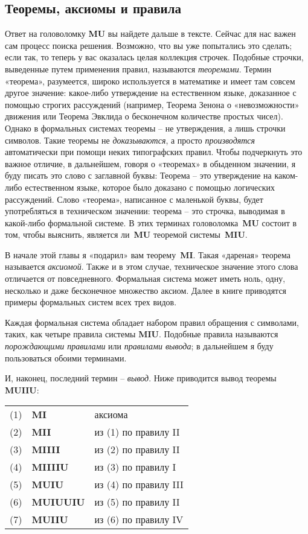 \documentclass[../main.tex]{subfiles}
\begin{document}
\subsection{Теоремы, аксиомы и правила}

Ответ на головоломку \textbf{MU} вы найдете дальше в тексте. Сейчас для нас важен сам процесс поиска решения. Возможно, что вы уже попытались это сделать; если так, то теперь у вас оказалась целая коллекция строчек. Подобные строчки, выведенные путем применения правил, называются \emph{теоремами}. Термин «теорема», разумеется, широко используется в математике и имеет там совсем другое значение: какое-либо утверждение на естественном языке, доказанное с помощью строгих рассуждений (например, Теорема Зенона о «невозможности» движения или Теорема Эвклида о бесконечном количестве простых чисел). Однако в формальных системах теоремы \--- не утверждения, а лишь строчки символов. Такие теоремы не \emph{доказываются}, а просто \emph{производятся} автоматически при помощи неких типографских правил. Чтобы подчеркнуть это важное отличие, в дальнейшем, говоря о «теоремах» в обыденном значении, я буду писать это слово с заглавной буквы: Теорема \--- это утверждение на каком-либо естественном языке, которое было доказано с помощью логических рассуждений. Слово «теорема», написанное с маленькой буквы, будет употребляться в техническом значении: теорема \--- это строчка, выводимая в какой-либо формальной системе. В этих терминах головоломка~\textbf{MU} состоит в том, чтобы выяснить, является ли~\textbf{MU} теоремой системы~\textbf{MIU}.

В начале этой главы я «подарил» вам теорему~\textbf{MI}\@. Такая «дареная» теорема называется \emph{аксиомой}. Также и в этом случае, техническое значение этого слова отличается от повседневного. Формальная система может иметь ноль, одну, несколько и даже бесконечное множество аксиом. Далее в книге приводятся примеры формальных систем всех трех видов.

Каждая формальная система обладает набором правил обращения с символами, таких, как четыре правила системы \textbf{MIU}\@. Подобные правила называются \emph{порождающими правилами} или \emph{правилами вывода}; в дальнейшем я буду пользоваться обоими терминами.

И, наконец, последний термин \--- \emph{вывод}. Ниже приводится вывод теоремы \textbf{MUIIU}:

\begin{block}
\begin{tabular}{@{} r @{~} l @{\quad} l @{}}
    (1) & \textbf{MI} & аксиома \\
    (2) & \textbf{MII} & из (1) по правилу II \\
    (3) & \textbf{MIIII} & из (2) по правилу II \\
    (4) & \textbf{MIIIIU} & из (3) по правилу I \\
    (5) & \textbf{MUIU} & из (4) по правилу III \\
    (6) & \textbf{MUIUUIU} & из (5) по правилу II \\
    (7) & \textbf{MUIIU} & из (6) по правилу IV \\
\end{tabular}
\end{block}
\end{document}
